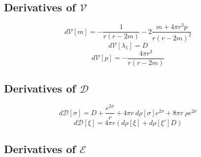 \subsection{Derivatives of $\mathcal{V}$}
\begin{equation}
d\mathcal{V}[m] = -\frac{1}{r(r-2m)} - 2 \frac{m+4\pi r^3 p}{r(r-2m)^2}
\end{equation}
\begin{equation}
d\mathcal{V}[\lambda_1] = D
\end{equation}
\begin{equation}
d\mathcal{V}[p] = -\frac{4\pi r^3}{r(r-2m)}
\end{equation}

\subsection{Derivatives of $\mathcal{D}$}
\begin{equation}
d\mathcal{D}[\sigma] = D + \frac{e^{2\sigma}}{r} + 4\pi r\ d\rho[\sigma] e^{2\sigma} + 8\pi r\ \rho e^{2\sigma}
\end{equation}
\begin{equation}
d\mathcal{D}[\xi] = 4\pi r \left(d\rho[\xi] + d\rho[\xi']D\right)
\end{equation}

\subsection{Derivatives of $\mathcal{E}$}
